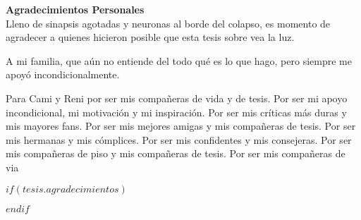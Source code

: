 \newpage
    \begin{center}
        {\large \textbf{Agradecimientos Personales}}\\[0.3cm]
        Lleno de sinapsis agotadas y neuronas al borde del colapso, es momento de agradecer a quienes hicieron posible que esta tesis sobre vea la luz.

        A mi familia, que aún no entiende del todo qué es lo que hago, pero siempre me apoyó incondicionalmente. 

    \end{center}

\newpage
    \begin{center}
        Para Cami y Reni por ser mis compañeras de vida y de tesis. Por ser mi apoyo incondicional, mi motivación y mi inspiración. Por ser mis críticas más duras y mis mayores fans. Por ser mis mejores amigas y mis compañeras de tesis. Por ser mis hermanas y mis cómplices. Por ser mis confidentes y mis consejeras. Por ser mis compañeras de piso y mis compañeras de tesis. Por ser mis compañeras de via
    \end{center}

\newpage
\begin{center}
\end{center}

\newpage

$if(tesis.agradecimientos)$

$endif$

\newpage
\tableofcontents